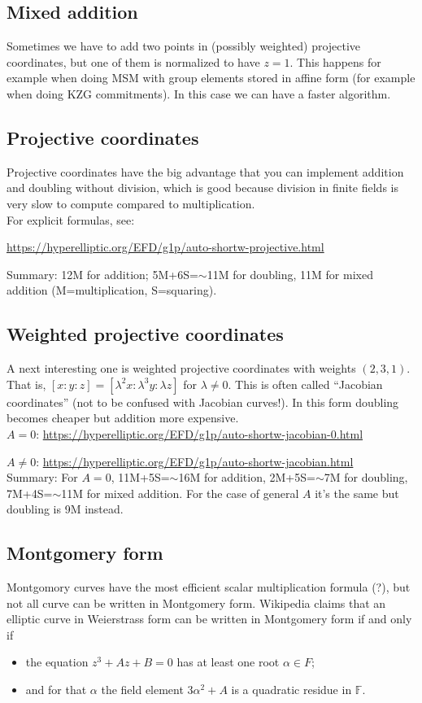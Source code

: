 \documentclass[12pt,draft,a4paper,openany,oneside]{amsbook}
\def\F{\mathbb{F}}
\theoremstyle{plain}
\theoremstyle{definition}
\begin{document}
\subsection{Mixed addition}
Sometimes we have to add two points in (possibly weighted) projective coordinates,
but one of them is normalized to have $z=1$. This happens for example when doing MSM 
with group elements stored in affine form (for example when doing KZG commitments).
In this case we can have a faster algorithm.

\subsection{Projective coordinates} 
Projective coordinates have the big advantage
that you can implement addition and doubling without division, which is good
because division in finite fields is very slow to compute compared to multiplication.\\

For explicit formulas, see:

\noindent
\url{https://hyperelliptic.org/EFD/g1p/auto-shortw-projective.html}

\noindent
Summary: 12M for addition; 5M+6S=$\sim$11M for doubling,
11M for mixed addition (M=multiplication, S=squaring).

\subsection{Weighted projective coordinates} 
A next interesting one is weighted projective
coordinates with weights $(2,3,1)$. That is, $[x:y:z] = [\lambda^2x:\lambda^3y:\lambda z]$
for $\lambda\neq0$. This is often called ``Jacobian coordinates'' (not to be confused
with Jacobian curves!). In this form doubling becomes cheaper but addition more expensive.\\

\noindent 
$A=0$:    \url{https://hyperelliptic.org/EFD/g1p/auto-shortw-jacobian-0.html}

\noindent
$A\neq0$: \url{https://hyperelliptic.org/EFD/g1p/auto-shortw-jacobian.html} \\

Summary: For $A=0$, 11M+5S=$\sim$16M for addition, 2M+5S=$\sim$7M for doubling,
7M+4S=$\sim$11M for mixed addition.
For the case of general $A$ it's the same but doubling is 9M instead.

\subsection{Montgomery form}
Montgomory curves have the most efficient scalar multiplication formula (?), but
not all curve can be written in Montgomery form. Wikipedia claims that an 
elliptic curve in Weierstrass form can be written in Montgomery form if and only if
\begin{itemize}
\item the equation $z^3 + Az + B=0$ has at least one root $\alpha\in F$;
\item and for that $\alpha$ the field element $3\alpha^2 + A$ is a quadratic residue in $\F$.
\end{itemize}
\end{document}
